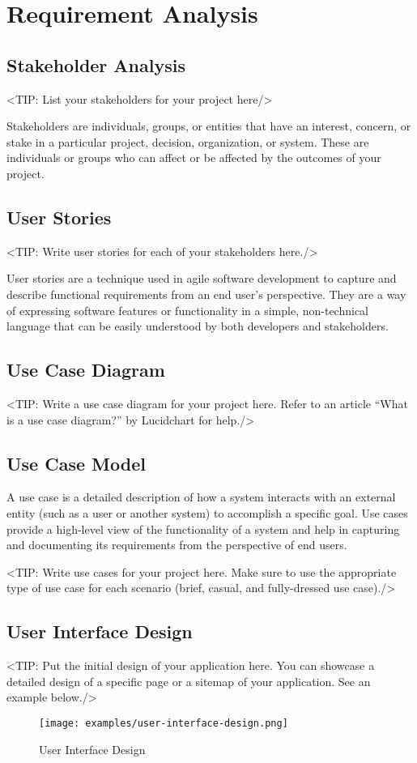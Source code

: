 \chapter{Requirement Analysis}
\label{chap:requirement-analysis}

\section{Stakeholder Analysis}
\label{section:stakeholder-analysis}
<TIP: List your stakeholders for your project here/>

Stakeholders are individuals, groups, or entities that
have an interest, concern, or stake in a particular project, decision,
organization, or system. These are individuals or groups who can affect or be
affected by the outcomes of your project.

\section{User Stories}
\label{section:user-stories}
<TIP: Write user stories for each of your stakeholders here./>

User stories are a technique used in agile software
development to capture and describe functional requirements from an end
user's perspective. They are a way of expressing software features or
functionality in a simple, non-technical language that can be easily understood
by both developers and stakeholders.

\section{Use Case Diagram}
\label{section:use-case-diagram}
<TIP: Write a use case diagram for your project here. Refer to an
article “What is a use case diagram?” by Lucidchart for help./>

\section{Use Case Model}
\label{section:use-case-model}
A use case is a detailed description of how a system
interacts with an external entity (such as a user or another system) to
accomplish a specific goal. Use cases provide a high-level view of the
functionality of a system and help in capturing and documenting its
requirements from the perspective of end users.

<TIP: Write use cases for your project here. Make sure to use the
appropriate type of use case for each scenario (brief, casual, and fully-dressed
use case)./>

\section{User Interface Design}
\label{section:user-interface-design}
<TIP: Put the initial design of your application here. You can
showcase a detailed design of a specific page or a sitemap of your application.
See an example below./>

\begin{figure}[h]
    \centering
    \texttt{[image: examples/user-interface-design.png]}
    \caption{User Interface Design}
\end{figure}
